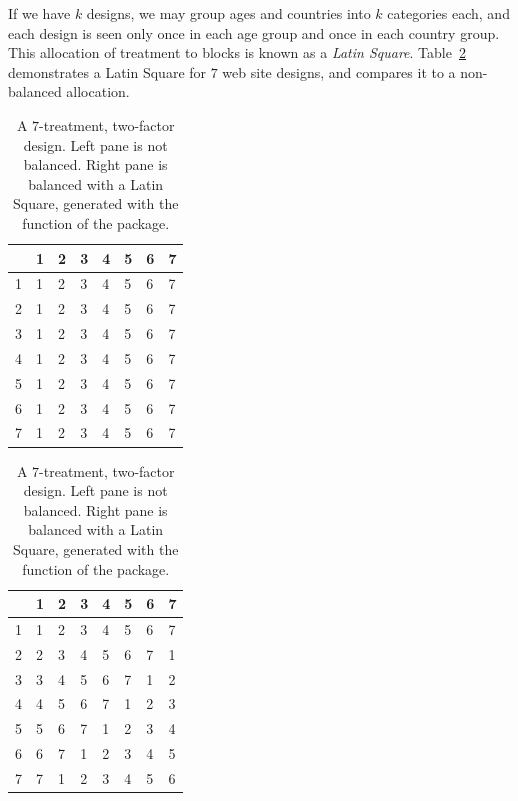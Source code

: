 If we have $k$ designs, we may group ages and countries into $k$ categories each, and each design is seen only once in each age group and once in each country group. 
This allocation of treatment to blocks is known as a \emph{Latin Square}. 
Table~\ref{tab:latin_square} demonstrates a Latin Square for $7$ web site designs, and compares it to a non-balanced allocation. 
\begin{table}[ht]
    \begin{minipage}{.5\linewidth}
        \centering
		\begin{tabular}{rlllllll}
		  \hline
		 & 1 & 2 & 3 & 4 & 5 & 6 & 7 \\ 
		  \hline
		1 & 1 & 2 & 3 & 4 & 5 & 6 & 7 \\ 
		2 & 1 & 2 & 3 & 4 & 5 & 6 & 7 \\ 
		3 & 1 & 2 & 3 & 4 & 5 & 6 & 7 \\ 
		4 & 1 & 2 & 3 & 4 & 5 & 6 & 7 \\ 
		5 & 1 & 2 & 3 & 4 & 5 & 6 & 7 \\ 
		6 & 1 & 2 & 3 & 4 & 5 & 6 & 7 \\ 
		7 & 1 & 2 & 3 & 4 & 5 & 6 & 7 \\ 
		   \hline
		\end{tabular}
    \end{minipage}%
    \begin{minipage}{.5\linewidth}
      \centering
		\begin{tabular}{rlllllll}
		  \hline
		 & 1 & 2 & 3 & 4 & 5 & 6 & 7 \\ 
		  \hline
		1 & 1 & 2 & 3 & 4 & 5 & 6 & 7 \\ 
		  2 & 2 & 3 & 4 & 5 & 6 & 7 & 1 \\ 
		  3 & 3 & 4 & 5 & 6 & 7 & 1 & 2 \\ 
		  4 & 4 & 5 & 6 & 7 & 1 & 2 & 3 \\ 
		  5 & 5 & 6 & 7 & 1 & 2 & 3 & 4 \\ 
		  6 & 6 & 7 & 1 & 2 & 3 & 4 & 5 \\ 
		  7 & 7 & 1 & 2 & 3 & 4 & 5 & 6 \\ 
		   \hline
		\end{tabular}
		\end{minipage} 
\caption{A $7$-treatment, two-factor design. 
Left pane is not balanced.
Right pane is balanced with a Latin Square, generated with the  function of the  \R package.}
\label{tab:latin_square}		
\end{table}


